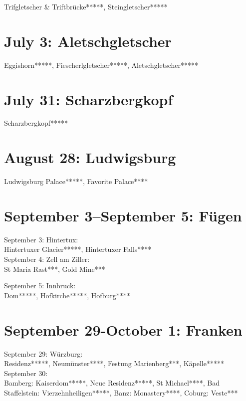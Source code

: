 Trifgletscher \& Triftbr\"ucke*****, Steingletscher*****

\section{July 3: Aletschgletscher}
\label{Aletsch2011}

Eggishorn*****, Fiescherlgletscher*****, Aletschgletscher*****

\section{July 31: Scharzbergkopf}
\label{Saasalmagell2011}

Scharzbergkopf*****

\section{August 28: Ludwigsburg}
\label{Ludwigsburg2011}

Ludwigsburg Palace*****, Favorite Palace****

\section{September 3--September 5: F\"ugen}
\label{Tirol2011}

September 3: Hintertux:\\
Hintertuxer Glacier*****, Hintertuxer Falls****\\

September 4: Zell am Ziller:\\
St Maria Rast***, Gold Mine***

September 5: Innbruck:\\
Dom*****, Hofkirche*****, Hofburg****

\section{September 29-October 1: Franken}
\label{Franken2011}

September 29: W\"urzburg:\\
Residenz*****, Neum\"unster****, Festung Marienberg***, K\"apelle*****\\

September 30:\\
Bamberg: Kaiserdom*****, Neue Residenz*****, St Michael****, Bad Staffelstein: Vierzehnheiligen*****, Banz: Monastery****, Coburg: Veste***\\

